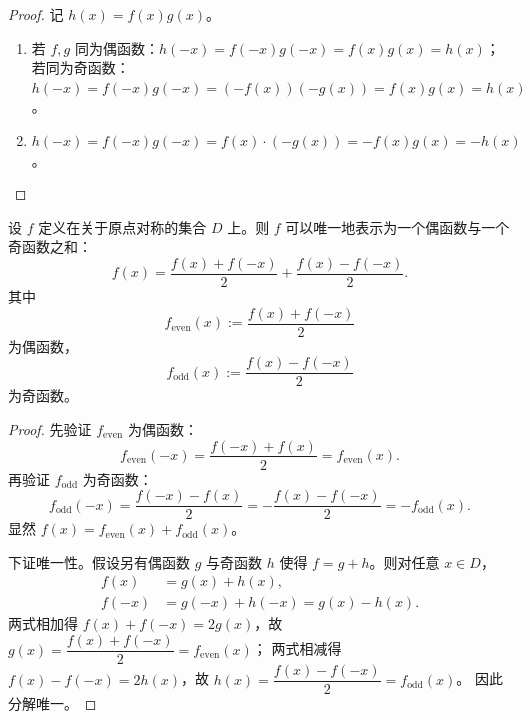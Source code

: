 \begin{proof}
	记 $h(x) = f(x) g(x)$。
	\begin{enumerate}
		\item 若 $f, g$ 同为偶函数：$h(-x) = f(-x)g(-x) = f(x)g(x) = h(x)$；
		若同为奇函数：$h(-x) = f(-x)g(-x) = (-f(x))(-g(x)) = f(x)g(x) = h(x)$。
		\item $h(-x) = f(-x)g(-x) = f(x) \cdot (-g(x)) = -f(x)g(x) = -h(x)$。
	\end{enumerate}
\end{proof}

\begin{proposition}[函数的奇偶分解]
	设 $f$ 定义在关于原点对称的集合 $D$ 上。则 $f$ 可以唯一地表示为一个偶函数与一个奇函数之和：
	\[
	f(x) = \frac{f(x) + f(-x)}{2} + \frac{f(x) - f(-x)}{2}.
	\]
	其中
	\[
	f_{\mathrm{even}}(x) := \frac{f(x) + f(-x)}{2}
	\]
	为偶函数，
	\[
	f_{\mathrm{odd}}(x) := \frac{f(x) - f(-x)}{2}
	\]
	为奇函数。
\end{proposition}

\begin{proof}
	先验证 $f_{\mathrm{even}}$ 为偶函数：
	\[
	f_{\mathrm{even}}(-x) = \frac{f(-x) + f(x)}{2} = f_{\mathrm{even}}(x).
	\]
	再验证 $f_{\mathrm{odd}}$ 为奇函数：
	\[
	f_{\mathrm{odd}}(-x) = \frac{f(-x) - f(x)}{2} = -\frac{f(x) - f(-x)}{2} = -f_{\mathrm{odd}}(x).
	\]
	显然 $f(x) = f_{\mathrm{even}}(x) + f_{\mathrm{odd}}(x)$。
	
	下证唯一性。假设另有偶函数 $g$ 与奇函数 $h$ 使得 $f = g + h$。则对任意 $x \in D$，
	\[
	\begin{aligned}
		f(x) &= g(x) + h(x), \\
		f(-x) &= g(-x) + h(-x) = g(x) - h(x).
	\end{aligned}
	\]
	两式相加得 $f(x) + f(-x) = 2g(x)$，故 $g(x) = \dfrac{f(x) + f(-x)}{2} = f_{\mathrm{even}}(x)$；
	两式相减得 $f(x) - f(-x) = 2h(x)$，故 $h(x) = \dfrac{f(x) - f(-x)}{2} = f_{\mathrm{odd}}(x)$。
	因此分解唯一。
\end{proof}

